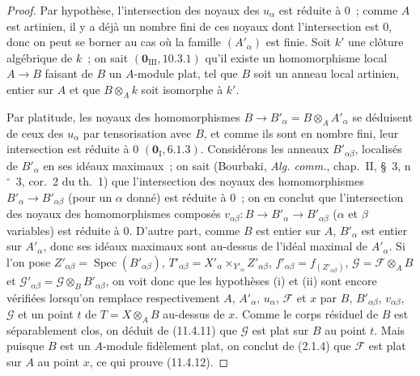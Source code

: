 \begin{proof}


Par hypothèse, l'intersection des noyaux des $u_\alpha$ est réduite à $0$~;
comme $A$ est artinien, il y a déjà un nombre fini de ces noyaux dont
l'intersection est $0$, donc on peut se borner au cas où la famille
$(A'_\alpha)$ est finie. Soit $k'$ une clôture algébrique de $k$~; on sait
$(\mathbf 0_{\mathrm{III}},10.3.1)$ qu'il existe un homomorphisme local
$A\to B$ faisant de $B$ un $A$-module plat, tel que $B$ soit un anneau local
artinien, entier sur $A$ et que $B\otimes_A k$ soit isomorphe à $k'$.

Par platitude, les noyaux des homomorphismes
$B\to B'_\alpha=B\otimes_A A'_\alpha$ se déduisent de ceux des $u_\alpha$ par
tensorisation avec $B$, et comme ils sont en nombre fini, leur intersection est
réduite à $0$ $(\mathbf 0_{\mathrm I},6.1.3)$. Considérons les anneaux
$B'_{\alpha\beta}$, localisés de $B'_\alpha$ en ses idéaux maximaux~; on sait
(Bourbaki, \emph{Alg. comm.}, chap.~II, \S~3, n$^\circ$~3, cor.~2 du th.~1)
que l'intersection des noyaux des homomorphismes
$B'_\alpha\to B'_{\alpha\beta}$ (pour un $\alpha$ donné) est réduite à $0$~;
on en conclut que l'intersection des noyaux des homomorphismes composés
$v_{\alpha\beta}:B\to B'_\alpha\to B'_{\alpha\beta}$ ($\alpha$ et $\beta$
variables) est réduite à $0$. D'autre part, comme $B$ est entier sur $A$,
$B'_\alpha$ est entier sur $A'_\alpha$, donc ses idéaux maximaux sont au-dessus
de l'idéal maximal de $A'_\alpha$. Si l'on pose
$Z'_{\alpha\beta}=\operatorname{Spec}(B'_{\alpha\beta})$,
$T'_{\alpha\beta}=X'_\alpha\times_{Y'_\alpha}Z'_{\alpha\beta}$,
$f'_{\alpha\beta}=f_{(Z'_{\alpha\beta})}$,
$\mathcal G=\mathcal F\otimes_A B$ et
$\mathcal G'_{\alpha\beta}=\mathcal G\otimes_B B'_{\alpha\beta}$, on voit donc
que les hypothèses (i) et (ii) sont encore vérifiées lorsqu'on remplace
respectivement $A$, $A'_\alpha$, $u_\alpha$, $\mathcal F$ et $x$ par $B$,
$B'_{\alpha\beta}$, $v_{\alpha\beta}$, $\mathcal G$ et un point $t$ de
$T=X\otimes_A B$ au-dessus de $x$. Comme le corps résiduel de $B$ est
séparablement clos, on déduit de (11.4.11) que $\mathcal G$ est plat sur $B$ au
point $t$. Mais puisque $B$ est un $A$-module fidèlement plat, on conclut de
(2.1.4) que $\mathcal F$ est plat sur $A$ au point $x$, ce qui prouve (11.4.12).
\end{proof}

